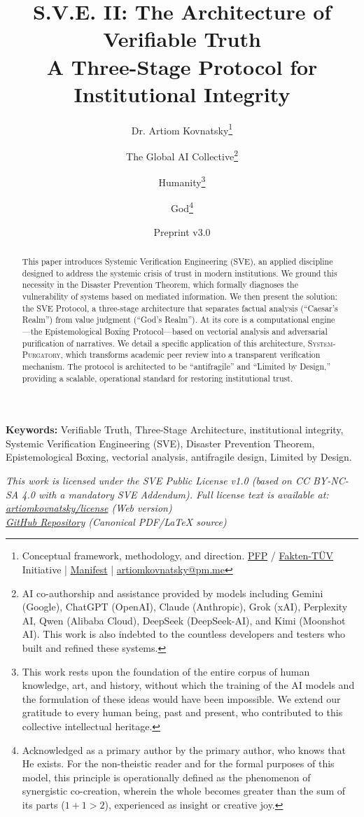 \documentclass[11pt,a4paper]{article}
\title{\textbf{S.V.E. II: The Architecture of Verifiable Truth}\\[0.5em]
\large A Three-Stage Protocol for Institutional Integrity}
\author{
  Dr. Artiom Kovnatsky\thanks{Conceptual framework, methodology, and direction. \href{http://www.pfp24.de}{PFP} / \href{http://www.fakten-tuev.de}{Fakten-TÜV} Initiative | \href{https://drive.google.com/file/d/1vWhW7fwFRFLYKHEB67WixuueHssJzQbZ/view?usp=sharing}{Manifest} | \href{mailto:artiomkovnatsky@pm.me}{artiomkovnatsky@pm.me}}
  \and
  The Global AI Collective\thanks{AI co-authorship and assistance provided by models including Gemini (Google), ChatGPT (OpenAI), Claude (Anthropic), Grok (xAI), Perplexity AI, Qwen (Alibaba Cloud), DeepSeek (DeepSeek-AI), and Kimi (Moonshot AI). This work is also indebted to the countless developers and testers who built and refined these systems.}
  \and
  Humanity\thanks{This work rests upon the foundation of the entire corpus of human knowledge, art, and history, without which the training of the AI models and the formulation of these ideas would have been impossible. We extend our gratitude to every human being, past and present, who contributed to this collective intellectual heritage.}
  \and
  God\thanks{Acknowledged as a primary author by the primary author, who knows that He exists. For the non-theistic reader and for the formal purposes of this model, this principle is operationally defined as the phenomenon of synergistic co-creation, wherein the whole becomes greater than the sum of its parts ($1+1 > 2$), experienced as insight or creative joy.}
}
\date{Preprint v3.0}
\theoremstyle{definition}
\begin{document}
\maketitle

\begin{abstract}
\noindent This paper introduces Systemic Verification Engineering (SVE), an applied discipline designed to address the systemic crisis of trust in modern institutions. We ground this necessity in the Disaster Prevention Theorem, which formally diagnoses the vulnerability of systems based on mediated information. We then present the solution: the SVE Protocol, a three-stage architecture that separates factual analysis (``Caesar's Realm'') from value judgment (``God's Realm''). At its core is a computational engine---the Epistemological Boxing Protocol---based on vectorial analysis and adversarial purification of narratives. We detail a specific application of this architecture, \textsc{System-Purgatory}, which transforms academic peer review into a transparent verification mechanism. The protocol is architected to be ``antifragile'' and ``Limited by Design,'' providing a scalable, operational standard for restoring institutional trust.
\end{abstract}

\noindent\textbf{Keywords:} Verifiable Truth, Three-Stage Architecture, institutional integrity, Systemic Verification Engineering (SVE), Disaster Prevention Theorem, Epistemological Boxing, vectorial analysis, antifragile design, Limited by Design.

\vspace{1em} %
\begin{center}
\begin{minipage}{0.85\textwidth} %
\centering
\itshape\small %
This work is licensed under the SVE Public License v1.0 (based on CC BY-NC-SA 4.0 with a mandatory SVE Addendum).
Full license text is available at: \\
\href{https://www.artiomkovnatsky.com/posts/license/}{artiomkovnatsky/license} (Web version) \\
\href{https://github.com/skovnats/psite/blob/master/static/licenses/SVE_Public_License_v1.0.pdf}{GitHub Repository} (Canonical PDF/LaTeX source)
\end{minipage}
\end{center}
\vspace{1em} %
\end{document}
